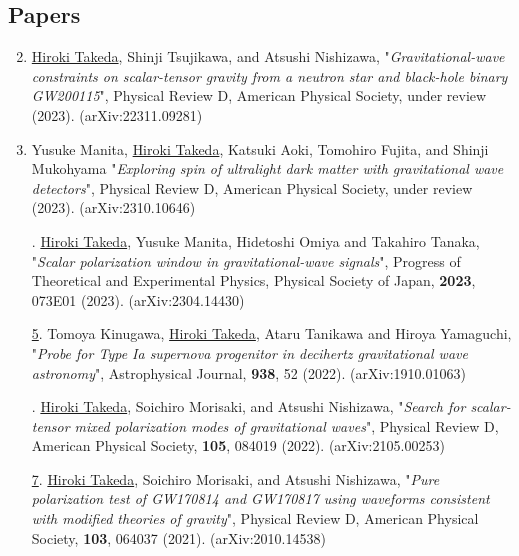 \documentclass[uplatex, 12pt]{article}
\newcommand{\ctext}[1]{\ooalign{
\hfil\resizebox{\width}{\height}{#1}\hfil
\crcr
\raise.2mm\hbox{\large$\bigcirc$}}}
\begin{document}
\subsection*{Papers}
\begin{enumerate}
\setcounter{enumi}{1}
\item \uline{Hiroki Takeda}, Shinji Tsujikawa, and Atsushi Nishizawa,
"\emph{Gravitational-wave constraints on scalar-tensor gravity from a neutron star and black-hole binary GW200115}",
Physical Review D, American Physical Society, under review (2023).
(arXiv:22311.09281)\\

   \item Yusuke Manita, \uline{Hiroki Takeda}, Katsuki Aoki, Tomohiro Fujita, and Shinji Mukohyama
"\emph{Exploring spin of ultralight dark matter with gravitational wave detectors}",
Physical Review D, American Physical Society, under review (2023).
(arXiv:2310.10646)\\

\item[\uline{\ctext{4}}.] \uline{Hiroki Takeda}, Yusuke Manita, Hidetoshi Omiya and Takahiro Tanaka, "\emph{Scalar polarization window in gravitational-wave signals}", Progress of Theoretical and Experimental Physics, Physical Society of Japan, {\bf 2023}, 073E01 (2023). (arXiv:2304.14430)\\

\item[\uline{5}.] Tomoya Kinugawa, \uline{Hiroki Takeda}, Ataru Tanikawa and Hiroya Yamaguchi, "\emph{Probe for Type Ia supernova progenitor in decihertz gravitational wave astronomy}", Astrophysical Journal, {\bf 938}, 52 (2022). (arXiv:1910.01063)\\

\item[\uline{\ctext{6}}.] \uline{Hiroki Takeda}, Soichiro Morisaki, and Atsushi Nishizawa,
"\emph{Search for scalar-tensor mixed polarization modes of gravitational waves}",
Physical Review D, American Physical Society, {\bf 105}, 084019 (2022).
(arXiv:2105.00253)\\

   \item[\uline{7}.] \uline{Hiroki Takeda}, Soichiro Morisaki, and Atsushi Nishizawa, "\emph{Pure polarization test of GW170814 and GW170817 using waveforms consistent with modified theories of gravity}", Physical Review D, American Physical Society, {\bf 103}, 064037 (2021). (arXiv:2010.14538)\\
   

\end{enumerate}
\end{document}
